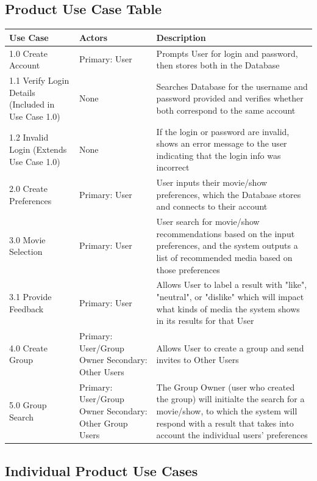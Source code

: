 \documentclass[12pt]{article}
\begin{document}
\subsection{Product Use Case Table}
\label{8.2}
\begin{tabularx}{\textwidth}{|p{4cm}p{6cm}X|}
	\toprule {\bf Use Case} & {\bf Actors} & {\bf Description}\\
	\hline
	1.0 Create Account & Primary: User & Prompts User for login and password, then stores both in the Database \\
	\hline
	1.1 Verify Login Details \newline (Included in Use Case 1.0) & None & Searches Database for the username and password provided and verifies whether both correspond to the same account \\
	\hline
	1.2 Invalid Login \newline (Extends Use Case 1.0) & None & If the login or password are invalid, shows an error message to the user indicating that the login info was incorrect \\
	\hline
	2.0 Create Preferences & Primary: User & User inputs their movie/show preferences, which the Database stores and connects to their account \\
	\hline
	3.0 Movie Selection & Primary: User & User search for movie/show recommendations based on the input preferences, and the system outputs a list of recommended media based on those preferences \\
	\hline
	3.1 Provide Feedback & Primary: User & Allows User to label a result with "like", "neutral", or "dislike" which will impact what kinds of media the system shows in its results for that User \\
	\hline
	4.0 Create Group & Primary: User/Group Owner \newline Secondary: Other Users & Allows User to create a group and send invites to Other Users \\
	\hline
	5.0 Group Search & Primary: User/Group Owner \newline Secondary: Other Group Users & The Group Owner (user who created the group) will initialte the search for a movie/show, to which the system will respond with a result that takes into account the individual users' preferences \\
	\hline
	\end{tabularx}

\subsection{Individual Product Use Cases}
\end{document}
